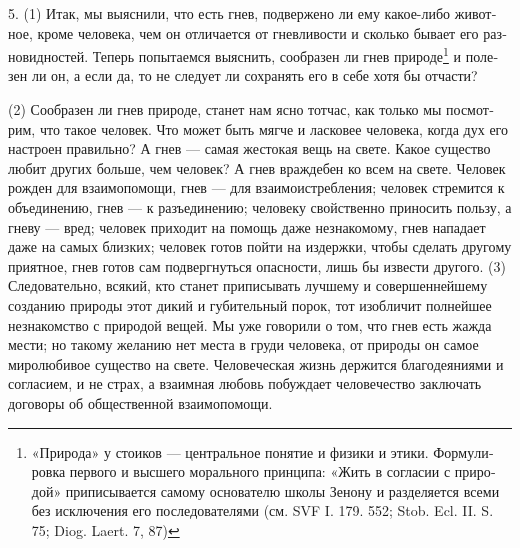 5. (1) Итак, мы выяс­ни­ли, что есть гнев, под­вер­же­но ли ему какое-либо живот­ное, кро­ме чело­ве­ка, чем он отли­ча­ет­ся от гнев­ли­во­сти и сколь­ко быва­ет его раз­но­вид­но­стей. Теперь попы­та­ем­ся выяс­нить, сооб­ра­зен ли гнев природе\footnote{«При­ро­да» у сто­и­ков --- цен­траль­ное поня­тие и физи­ки и эти­ки. Фор­му­ли­ров­ка пер­во­го и выс­ше­го мораль­но­го прин­ци­па: «Жить в согла­сии с при­ро­дой» при­пи­сы­ва­ет­ся само­му осно­ва­те­лю шко­лы Зено­ну и разде­ля­ет­ся все­ми без исклю­че­ния его после­до­ва­те­ля­ми (см. SVF I. 179. 552; Stob. Ecl. II. S. 75; Diog. Laert. 7, 87)} и поле­зен ли он, а если да, то не сле­ду­ет ли сохра­нять его в себе хотя бы отча­сти?

(2) Сооб­ра­зен ли гнев при­ро­де, станет нам ясно тот­час, как толь­ко мы посмот­рим, что такое чело­век. Что может быть мяг­че и лас­ко­вее чело­ве­ка, когда дух его настро­ен пра­виль­но? А гнев --- самая жесто­кая вещь на све­те. Какое суще­ство любит дру­гих боль­ше, чем чело­век? А гнев враж­де­бен ко всем на све­те. Чело­век рож­ден для вза­и­мо­по­мо­щи, гнев --- для вза­и­мо­ис­треб­ле­ния; чело­век стре­мит­ся к объ­еди­не­нию, гнев --- к разъ­еди­не­нию; чело­ве­ку свой­ст­вен­но при­но­сить поль­зу, а гне­ву --- вред; чело­век при­хо­дит на помощь даже незна­ко­мо­му, гнев напа­да­ет даже на самых близ­ких; чело­век готов пой­ти на издерж­ки, чтобы сде­лать дру­го­му при­ят­ное, гнев готов сам под­верг­нуть­ся опас­но­сти, лишь бы изве­сти дру­го­го. (3) Сле­до­ва­тель­но, вся­кий, кто станет при­пи­сы­вать луч­ше­му и совер­шен­ней­ше­му созда­нию при­ро­ды этот дикий и губи­тель­ный порок, тот изоб­ли­чит пол­ней­шее незна­ком­ство с при­ро­дой вещей. Мы уже гово­ри­ли о том, что гнев есть жаж­да мести; но тако­му жела­нию нет места в груди чело­ве­ка, от при­ро­ды он самое миро­лю­би­вое суще­ство на све­те. Чело­ве­че­ская жизнь дер­жит­ся бла­го­де­я­ни­я­ми и согла­си­ем, и не страх, а вза­им­ная любовь побуж­да­ет чело­ве­че­ство заклю­чать дого­во­ры об обще­ст­вен­ной вза­и­мо­по­мо­щи.

